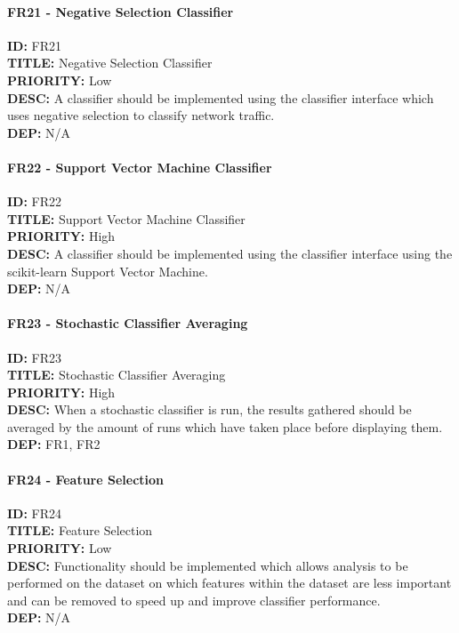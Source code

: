 \paragraph*{FR21 - Negative Selection Classifier}
\textbf{ID:} FR21 \\
\textbf{TITLE:} Negative Selection Classifier \\
\textbf{PRIORITY:} Low \\
\textbf{DESC:} A classifier should be implemented using the classifier interface which uses negative selection to classify network traffic. \\
\textbf{DEP:} N/A
\paragraph*{FR22 - Support Vector Machine Classifier}
\textbf{ID:} FR22 \\
\textbf{TITLE:} Support Vector Machine Classifier \\
\textbf{PRIORITY:} High \\
\textbf{DESC:}  A classifier should be implemented using the classifier interface using the scikit-learn Support Vector Machine. \\
\textbf{DEP:} N/A
\paragraph*{FR23 - Stochastic Classifier Averaging}
\textbf{ID:} FR23 \\
\textbf{TITLE:} Stochastic Classifier Averaging \\
\textbf{PRIORITY:} High \\
\textbf{DESC:} When a stochastic classifier is run, the results gathered should be averaged by the amount of runs which have taken place before displaying them.  \\
\textbf{DEP:} FR1, FR2
\paragraph*{FR24 - Feature Selection}
\textbf{ID:} FR24 \\
\textbf{TITLE:} Feature Selection \\
\textbf{PRIORITY:} Low \\
\textbf{DESC:} Functionality should be implemented which allows analysis to be performed on the dataset on which features within the dataset are less important and can be removed to speed up and improve classifier performance.  \\
\textbf{DEP:} N/A

